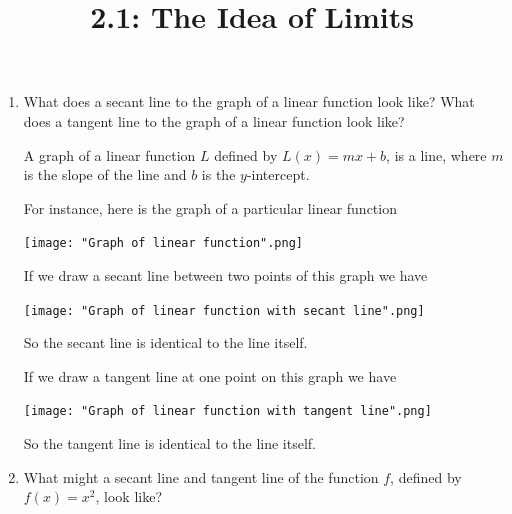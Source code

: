 \documentclass[nooutcomes]{ximera}
\title{2.1:  The Idea of Limits}
\begin{document}
\begin{abstract}		\end{abstract}
\maketitle


 \begin{problem} \hfil

	\begin{enumerate}

		\item What does a secant line to the graph of a  linear function look like?  What does a tangent line to the graph of a linear function look like? 

 \begin{freeResponse}		 
	
	A graph of a linear function $L$ defined by $L(x) = mx + b$, is a line, where $m$ is the slope of the line and $b$ is the $y$-intercept.
      
        For instance, here is the graph of a particular linear function
        \begin{image}
          \texttt{[image: "Graph of linear function".png]}
        \end{image}

        If we draw a secant line between two points of this graph we have
        \begin{image}
          \texttt{[image: "Graph of linear function with secant line".png]}
        \end{image}
        So the secant line is identical to the line itself.

        If we draw a tangent line at one point on this graph we have
        \begin{image}
          \texttt{[image: "Graph of linear function with tangent line".png]}
        \end{image}
        So the tangent line is identical to the line itself.
\end{freeResponse}


		\item  What might a secant line and tangent line of the function $f$, defined by $f(x) = x^2$, look like?


\end{enumerate}
\end{problem}
\end{document}
